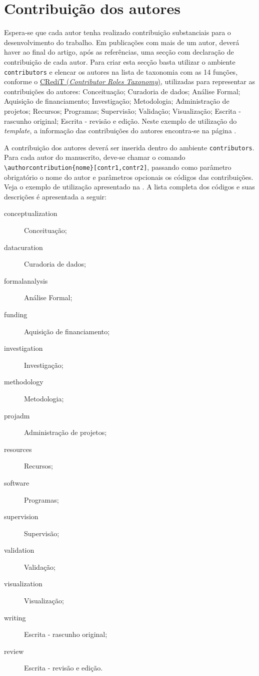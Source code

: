 \documentclass[portuguese]{textolivre}
\begin{document}
\lipsum[20-21]


\section{Contribuição dos autores}\label{sec-contributors-expl}
Espera-se que cada autor tenha realizado contribuição substanciais para o desenvolvimento do trabalho.
Em publicações com mais de um autor, deverá haver ao final do artigo, após as referências, uma
secção com declaração de contribuição de cada autor. Para criar esta secção basta utilizar o
ambiente \verb|contributors| e elencar os autores na lista de taxonomia com as 14 funções, conforme o
\href{http://credit.niso.org/}{CRediT (\emph{Contributor Roles Taxonomy})}, utilizadas para representar as contribuições do autores:
Conceituação; Curadoria de dados; Análise Formal; Aquisição de financiamento; Investigação;
Metodologia; Administração de projetos; Recursos; Programas; Supervisão; Validação;
Visualização; Escrita - rascunho original; Escrita - revisão e edição.
Neste exemplo de utilização do \emph{template}, a informação das contribuições do autores encontra-se na página \pageref{sec-contributors}.

A contribuição dos autores deverá ser inserida dentro do ambiente \verb|contributors|. Para cada autor do manuscrito,
deve-se chamar o comando \verb|\authorcontribution{nome}[contr1,contr2]|, passando como parâmetro obrigatório o nome do autor 
e parâmetros opcionais os códigos das contribuições. Veja o exemplo de utilização apresentado na .
A lista completa dos códigos e suas descrições é apresentada a seguir:
\begin{description}
\item[conceptualization] Conceituação;
\item[datacuration] Curadoria de dados;
\item[formalanalysis] Análise Formal;
\item[funding] Aquisição de financiamento;
\item[investigation] Investigação;
\item[methodology] Metodologia;
\item[projadm] Administração de projetos; 
\item[resources] Recursos;
\item[software] Programas;
\item[supervision] Supervisão;
\item[validation] Validação;
\item[visualization] Visualização;
\item[writing] Escrita - rascunho original;
\item[review] Escrita - revisão e edição.
\end{description}
\end{document}
